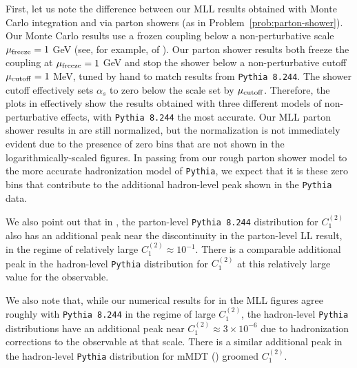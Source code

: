 First, let us note the difference between our MLL results obtained with Monte Carlo integration and via parton showers (as in Problem~\ref{prob:parton-shower}).
%
Our Monte Carlo results use a frozen coupling below a non-perturbative scale \(\mu_{\rm freeze} = 1\) GeV (see, for example,  of ).
%
Our parton shower results both freeze the coupling at \(\mu_{\rm freeze} = 1\) GeV and stop the shower below a non-perturbative cutoff \(\mu_{\rm cutoff} = 1\) MeV, tuned by hand to match results from \texttt{Pythia 8.244}.
%
The shower cutoff effectively sets \(\alpha_s\) to zero below the scale set by \(\mu_{\rm cutoff}\).
%
Therefore, the plots in  effectively show the results obtained with three different models of non-perturbative effects, with \texttt{Pythia 8.244} the most accurate.
%
Our MLL parton shower results in  are still normalized, but the normalization is not immediately evident due to the presence of zero bins that are not shown in the logarithmically-scaled figures.
%
In passing from our rough parton shower model to the more accurate \gls{hadronization} model of \texttt{Pythia}, we expect that it is these zero bins that contribute to the additional hadron-level peak shown in the \texttt{Pythia} data.

We also point out that in , the parton-level \texttt{Pythia 8.244} distribution for \(C_1^{(2)}\) also has an additional peak near the discontinuity in the parton-level LL result, in the regime of relatively large \(C_1^{(2)} \approx 10^{-1}\).
%
There is a comparable additional peak in the hadron-level \texttt{Pythia} distribution for \(C_1^{(2)}\) at this relatively large value for the observable.

We also note that, while our numerical results for  in the MLL figures agree roughly with \texttt{Pythia 8.244} in the regime of large \(C_1^{(2)}\), the hadron-level \texttt{Pythia} distributions have an additional peak near \(C_1^{(2)} \approx 3\times 10^{-6}\) due to \gls{hadronization} corrections to the observable at that scale.
%
There is a similar additional peak in the hadron-level \texttt{Pythia} distribution for mMDT () groomed \(C_1^{(2)}\).



